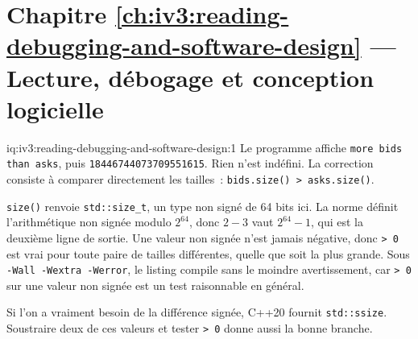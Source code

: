 \section*{Chapitre \ref{ch:iv3:reading-debugging-and-software-design} --- Lecture, débogage et conception logicielle}

\begin{solution}{iq:iv3:reading-debugging-and-software-design:1}
Le programme affiche \texttt{more bids than asks}, puis \texttt{18446744073709551615}. Rien n'est indéfini. La correction consiste à comparer directement les tailles~: \texttt{bids.size() > asks.size()}.

\texttt{size()} renvoie \texttt{std::size\_t}, un type non signé de 64 bits ici. La norme définit l'arithmétique non signée modulo $2^{64}$, donc $2 - 3$ vaut $2^{64} - 1$, qui est la deuxième ligne de sortie. Une valeur non signée n'est jamais négative, donc \texttt{> 0} est vrai pour toute paire de tailles différentes, quelle que soit la plus grande. Sous \texttt{-Wall -Wextra -Werror}, le listing compile sans le moindre avertissement, car \texttt{> 0} sur une valeur non signée est un test raisonnable en général.

Si l'on a vraiment besoin de la différence signée, C++20 fournit \texttt{std::ssize}. Soustraire deux de ces valeurs et tester \texttt{> 0} donne aussi la bonne branche.



\end{solution}

